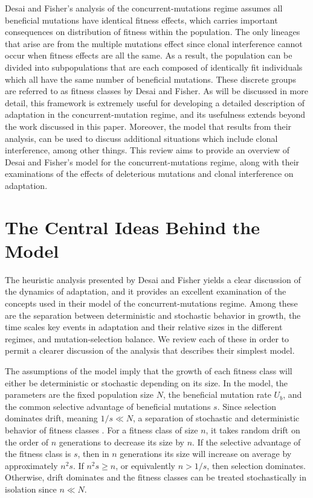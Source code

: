 \documentclass[12pt, one column]{article}
\begin{document}
Desai and Fisher's analysis of the concurrent-mutations regime assumes all beneficial mutations have identical fitness effects, which carries important consequences on distribution of fitness within the population.  The only lineages that arise are from the multiple mutations effect since clonal interference cannot occur when fitness effects are all the same.  As a result, the population can be divided into subpopulations that are each composed of identically fit individuals which all have the same number of beneficial mutations.  These discrete groups are referred to as fitness classes by Desai and Fisher.  As will be discussed in more detail, this framework is extremely useful for developing a detailed description of adaptation in the concurrent-mutation regime, and its usefulness extends beyond the work discussed in this paper.  Moreover, the model that results from their analysis, can be used to discuss additional situations which include clonal interference, among other things.  This review aims to provide an overview of Desai and Fisher's model for the concurrent-mutations regime, along with their examinations of the effects of deleterious mutations and clonal interference on adaptation.

\section*{The Central Ideas Behind the Model}
The heuristic analysis presented by Desai and Fisher yields a clear discussion of the dynamics of adaptation, and it provides an excellent examination of the concepts used in their model of the concurrent-mutations regime.  Among these are the separation between deterministic and stochastic behavior in growth, the time scales key events in adaptation and their relative sizes in the different regimes, and mutation-selection balance.  We review each of these in order to permit a clearer discussion of the analysis that describes their simplest model.     

The assumptions of the model imply that the growth of each fitness class will either be deterministic or stochastic depending on its size.  In the model, the parameters are the fixed population size $N$, the beneficial mutation rate $U_b$, and the common selective advantage of beneficial mutations $s$.  Since selection dominates drift, meaning $1/s \ll N$, a separation of stochastic and deterministic behavior of fitness classes .  For a fitness class of size $n$, it takes random drift on the order of $n$ generations to decrease its size by $n$.  If the selective advantage of the fitness class is $s$, then in $n$ generations its size will increase on average by approximately $n^2s$.  If $n^2s \ge n$, or equivalently $n>1/s$, then selection dominates.  Otherwise, drift dominates and the fitness classes can be treated stochastically in isolation since $n \ll N$.  
\end{document}
